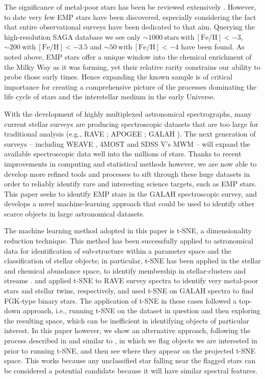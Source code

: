 \documentclass[]{aastex631}
\newcommand{\ts}{t-SNE\xspace}
\newcommand{\emps}{EMP stars\xspace}
\newcommand{\feh}{[Fe/H]\xspace}
\begin{document}
 The significance of metal-poor stars has been be reviewed extensively \citep[e.g.,][]{Beers2005,Frebel2015}. However, to date very few EMP stars have been discovered, especially considering the fact that entire observational surveys have been dedicated to that aim.
Querying the high-resolution SAGA database \citep{2008PASJ...60.1159S} we see only $\sim{1000} ~\mathrm{stars}~\mathrm{with ~\feh} < -3$, $\sim{200} ~\mathrm{with ~\feh} < -3.5$ and $\sim{50} ~\mathrm{with ~\feh} < -4$ have been found. 
As noted above, \emps offer a unique window into the chemical enrichment of the Milky Way as it was forming, yet their relative rarity constrains our ability to probe those early times. Hence expanding the known sample is of critical importance for creating a comprehensive picture of the processes dominating the life cycle of stars and the interstellar medium in the early Universe.


With the development of highly multiplexed astronomical spectrographs, many current stellar surveys are producing spectroscopic datasets that are too large for traditional analysis (e.g., RAVE \citealt{Steinmetz_2020}; APOGEE \citealt{SDSS-IV:2019};  GALAH \citealt{buder_2020}). The next generation of surveys -- including WEAVE \citep{Dalton_2014}, 4MOST \citep{Jong20194MOSTPO} and SDSS V's MWM \citep{kollmeier2017sdssv} -- will expand the available spectroscopic data well into the millions of stars.
Thanks to recent improvements in computing and statistical methods however, we are now able to develop more refined tools and processes to sift through these huge datasets in order to reliably identify rare and interesting science targets, such as \emps. This paper seeks to identify \emps in the GALAH spectroscopic survey, and develops a novel machine-learning approach that could be used to identify other scarce objects in large astronomical datasets.


 The machine learning method adopted in this paper is \ts \citep{maaten_visualizing_2008}, a dimensionality reduction technique. This method has been successfully applied to astronomical data for identification of sub-structure within a parameter space and the classification of stellar objects; in particular, \ts has been applied in the stellar and chemical abundance space, to identify membership in stellar-clusters and streams \citep[e.g.,][]{2018A&A...619A.125A,2018MNRAS.473.4612K}. \cite{2017A&A...603A..19M} and \cite{2017MNRAS.472.2517J} applied \ts to RAVE survey spectra to identify very metal-poor stars and stellar twins, respectively, and \cite{2020A&A...638A.145T} used \ts on GALAH spectra to find FGK-type binary stars. The application of \ts in these cases followed a top-down approach, i.e., running \ts on the dataset in question and then exploring the resulting space, which can be inefficient in identifying objects of particular interest. In this paper however, we show an alternative approach, following the process described in \cite{hughes2017} and similar to \cite{hawkins2021}, in which we flag objects we are interested in prior to running \ts, and then see where they appear on the projected \ts space. This works because any unclassified star falling near the flagged stars can be considered a potential candidate because it will have similar spectral features.
\end{document}
